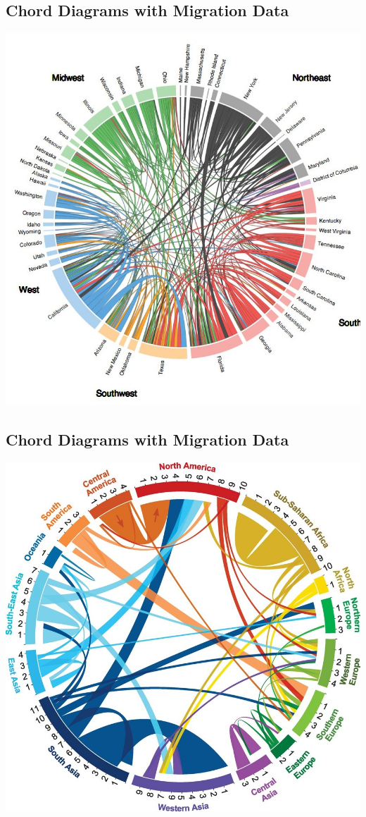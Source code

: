 \documentclass[
]{book}
\begin{document}
\hypertarget{chord-diagrams-with-migration-data-1}{%
\subsection{Chord Diagrams with Migration Data}\label{chord-diagrams-with-migration-data-1}}

\includegraphics[width=1\linewidth]{img/walker}

\hypertarget{chord-diagrams-with-migration-data-2}{%
\subsection{Chord Diagrams with Migration Data}\label{chord-diagrams-with-migration-data-2}}

\includegraphics[width=1\linewidth]{img/sander}
\end{document}
